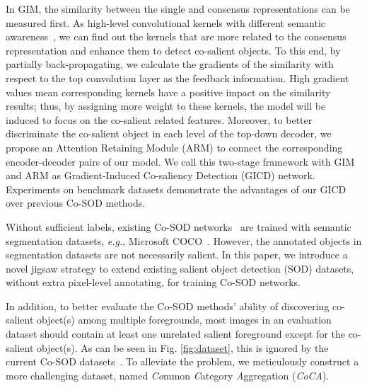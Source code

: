 \documentclass[runningheads,orivec]{llncs}
\newcommand{\figref}[1]{Fig. \ref{#1}}
\def\eg{\emph{e.g.}}
\begin{document}
In GIM, the similarity between the single and consensus representations can be measured first.
As high-level convolutional kernels with different semantic awareness~\cite{zhou2016cam,selvaraju2017gradcam},
we can find out the kernels that are more 
related to the consensus representation
and enhance them to detect co-salient objects.
To this end,
by partially back-propagating,
we calculate the gradients of the similarity with respect to the top convolution layer as the feedback information.
High gradient values mean corresponding kernels have a positive impact on the similarity results;
thus, by assigning more weight to these kernels, 
the model will be induced to focus on the co-salient related features.
Moreover, to better discriminate the co-salient object in each level of the top-down decoder, 
we propose an Attention Retaining Module (ARM) to connect the corresponding encoder-decoder pairs of our model.
We call this two-stage framework with GIM and ARM as Gradient-Induced Co-saliency Detection (GICD) network.
Experiments on benchmark datasets demonstrate the advantages of our GICD over previous Co-SOD methods.

Without sufficient labels, existing Co-SOD networks~\cite{wei2019deep,li2019detecting,wang2020robust} are trained with semantic segmentation datasets, \eg, Microsoft COCO~\cite{lin2014microsoft}.
However, the annotated objects in segmentation datasets are not necessarily salient.
In this paper, we introduce a novel jigsaw strategy to extend existing salient object detection (SOD) datasets, without extra pixel-level annotating, for training Co-SOD networks.


In addition, to better evaluate the Co-SOD methods' ability of discovering co-salient object(s) among multiple foregrounds, most images in an evaluation dataset should contain at least one unrelated salient foreground except for the co-salient object(s). 
As can be seen in \figref{fig:dataset}, this is ignored by the current Co-SOD datasets~\cite{winn2005object,batra2010icoseg,zhang2016CoSal,fan2020taking}.
To alleviate the problem, we meticulously construct a more challenging dataset, named \textsl{Co}mmon \textsl{C}ategory \textsl{A}ggregation (\textit{CoCA}).
\end{document}
